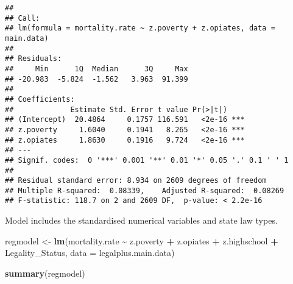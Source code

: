 \documentclass[
]{article}
\newenvironment{Shaded}{\begin{snugshade}}{\end{snugshade}}
\newcommand{\AttributeTok}[1]{\textcolor[rgb]{0.13,0.29,0.53}{#1}}
\newcommand{\FunctionTok}[1]{\textcolor[rgb]{0.13,0.29,0.53}{\textbf{#1}}}
\newcommand{\NormalTok}[1]{#1}
\newcommand{\OtherTok}[1]{\textcolor[rgb]{0.56,0.35,0.01}{#1}}
\newcommand{\SpecialCharTok}[1]{\textcolor[rgb]{0.81,0.36,0.00}{\textbf{#1}}}
\begin{document}
\begin{verbatim}
## 
## Call:
## lm(formula = mortality.rate ~ z.poverty + z.opiates, data = main.data)
## 
## Residuals:
##     Min      1Q  Median      3Q     Max 
## -20.983  -5.824  -1.562   3.963  91.399 
## 
## Coefficients:
##             Estimate Std. Error t value Pr(>|t|)    
## (Intercept)  20.4864     0.1757 116.591   <2e-16 ***
## z.poverty     1.6040     0.1941   8.265   <2e-16 ***
## z.opiates     1.8630     0.1916   9.724   <2e-16 ***
## ---
## Signif. codes:  0 '***' 0.001 '**' 0.01 '*' 0.05 '.' 0.1 ' ' 1
## 
## Residual standard error: 8.934 on 2609 degrees of freedom
## Multiple R-squared:  0.08339,    Adjusted R-squared:  0.08269 
## F-statistic: 118.7 on 2 and 2609 DF,  p-value: < 2.2e-16
\end{verbatim}

Model includes the standardised numerical variables and state law types.

\begin{Shaded}
\begin{Highlighting}[]
\NormalTok{regmodel }\OtherTok{\textless{}{-}} \FunctionTok{lm}\NormalTok{(mortality.rate }\SpecialCharTok{\textasciitilde{}}\NormalTok{ z.poverty }\SpecialCharTok{+}\NormalTok{ z.opiates }\SpecialCharTok{+}\NormalTok{ z.highschool  }\SpecialCharTok{+}\NormalTok{ Legality\_Status, }\AttributeTok{data =}\NormalTok{ legalplus.main.data)}

\FunctionTok{summary}\NormalTok{(regmodel)}
\end{Highlighting}
\end{Shaded}
\end{document}
